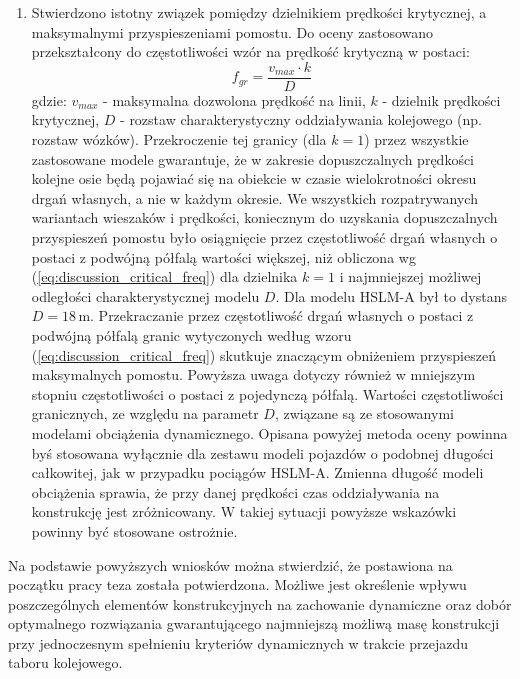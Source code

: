 \begin{enumerate}
\item Stwierdzono istotny związek pomiędzy dzielnikiem prędkości krytycznej, a maksymalnymi przyspieszeniami pomostu. Do oceny zastosowano przekształcony do częstotliwości wzór na prędkość krytyczną w postaci:
\begin{equation} \label{eq:discussion_critical_freq}
	f_{gr} = \frac{v_{max}\cdot k}{D} 
\end{equation}
gdzie: $v_{max}$ - maksymalna dozwolona prędkość na linii, $k$ - dzielnik prędkości krytycznej, $D$ - rozstaw charakterystyczny oddziaływania kolejowego (np. rozstaw wózków). Przekroczenie tej granicy (dla $k=1$) przez wszystkie zastosowane modele gwarantuje, że w zakresie dopuszczalnych prędkości kolejne osie będą pojawiać się na obiekcie w czasie wielokrotności okresu drgań własnych, a nie w każdym okresie. We wszystkich rozpatrywanych wariantach wieszaków i prędkości, koniecznym do uzyskania dopuszczalnych przyspieszeń pomostu było osiągnięcie przez częstotliwość drgań własnych o postaci z podwójną półfalą wartości większej, niż obliczona wg (\ref{eq:discussion_critical_freq}) dla dzielnika $k=1$ i najmniejszej możliwej odległości charakterystycznej modelu $D$. Dla modelu HSLM-A był to dystans $D=18\,\mathrm{m}$. Przekraczanie przez częstotliwość drgań własnych o postaci z podwójną półfalą granic wytyczonych według wzoru (\ref{eq:discussion_critical_freq}) skutkuje znaczącym obniżeniem przyspieszeń maksymalnych pomostu. Powyższa uwaga dotyczy również w mniejszym stopniu częstotliwości o postaci z pojedynczą półfalą. Wartości częstotliwości granicznych, ze względu na parametr $D$, związane są ze stosowanymi modelami obciążenia dynamicznego. Opisana powyżej metoda oceny powinna byś stosowana wyłącznie dla zestawu modeli pojazdów o podobnej długości całkowitej, jak w przypadku pociągów HSLM-A. Zmienna długość modeli obciążenia sprawia, że przy danej prędkości czas oddziaływania na konstrukcję jest zróżnicowany. W takiej sytuacji powyższe wskazówki powinny być stosowane ostrożnie.




\end{enumerate}

Na podstawie powyższych wniosków można stwierdzić, że postawiona na początku pracy teza została potwierdzona. Możliwe jest określenie wpływu poszczególnych elementów konstrukcyjnych na zachowanie dynamiczne oraz dobór optymalnego rozwiązania gwarantującego najmniejszą możliwą masę konstrukcji przy jednoczesnym spełnieniu kryteriów dynamicznych w trakcie przejazdu taboru kolejowego.

